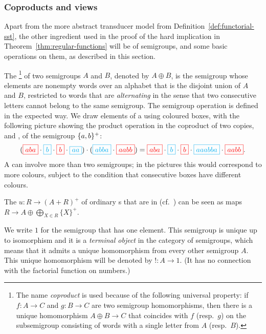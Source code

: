 


\subsubsection{Coproducts and views}
\label{sec:coproducts-and-views}

Apart from the more abstract transducer model from Definition~\ref{def:functorial-sst}, the other ingredient used  in the proof of the hard implication in Theorem~\ref{thm:regular-functions} will be  of semigroups, and some basic operations on them, as described in this section.

\AP The \footnote{The name \emph{coproduct} is used because of the following universal property: if $f\colon A \to C$ and $g\colon B \to C$ are two semigroup homomorphisms, then there is a unique homomorphism 
      $A \oplus B \to C$
  that coincides with $f$ (resp.~$g$) on the subsemigroup consisting of words with a single letter from $A$ (resp.~$B$).}  of two semigroups $A$ and $B$, denoted by $A \oplus B$, is the semigroup whose elements are nonempty words over an alphabet that is the disjoint union of $A$ and $B$, restricted to words that are \emph{alternating} in the sense that two consecutive letters cannot belong to the same semigroup. The semigroup operation is defined in the expected way. We draw elements of a  using coloured boxes, with the following picture showing the product operation in the coproduct of two copies,  and , of the semigroup $\{a,b\}^+$:
\begin{align*}
    ({\color{red}\boxed{aba}} \cdot 
    {\color{cyan}\boxed{b}} \cdot 
    {\color{red}\boxed{b}} \cdot 
    {\color{cyan}\boxed{aa}}) \cdot 
    (
        {\color{cyan}\boxed{abba}} \cdot 
        {\color{red}\boxed{aabb}}
    )
    = 
{\color{red}\boxed{aba}} \cdot 
    {\color{cyan}\boxed{b}} \cdot 
    {\color{red}\boxed{b}} \cdot 
    {\color{cyan}\boxed{aaabba}} \cdot 
        {\color{red}\boxed{aabb}}.
\end{align*}
A  can involve more than two semigroups; in the pictures this would correspond to more colours, subject to the condition that  consecutive boxes have different colours.
\begin{remark}
  The   $u : R \to (A + R)^+$ of ordinary \sst{}s that are in  (cf.~) can be seen as maps $R \to A \oplus \displaystyle \bigoplus_{X\in R} \{X\}^+$.
\end{remark}

We write $1$ for the semigroup that has one element. This semigroup is unique up
to isomorphism and it is a \emph{terminal object} in the category of semigroups,
which means that it admits a unique homomorphism from every other semigroup $A$.
This unique homomorphism will be denoted by $!\colon A \to 1$. (It has no
connection with the factorial function on numbers.)

